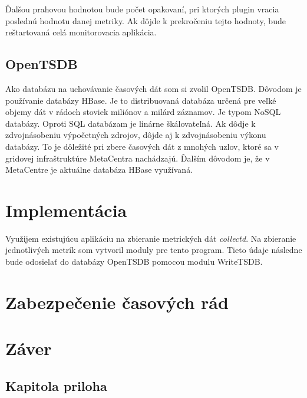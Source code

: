\documentclass[11pt,final,oneside]{fithesis}
\begin{document}
Ďalšou prahovou hodnotou bude počet opakovaní, pri ktorých plugin vracia poslednú hodnotu danej metriky. Ak dôjde k prekročeniu tejto hodnoty, bude reštartovaná celá monitorovacia aplikácia.

\section{OpenTSDB}
Ako databázu na uchovávanie časových dát som si zvolil OpenTSDB. Dôvodom je používanie databázy HBase. Je to distribuovaná databáza určená pre veľké objemy dát v rádoch stoviek miliónov a milárd záznamov. 
Je typom NoSQL databázy. Oproti SQL databázam je linárne škálovateľná. Ak dôdje k zdvojnásobeniu výpočetných zdrojov, dôjde aj k zdvojnásobeniu výkonu databázy. To je dôležité pri zbere časových dát z mnohých uzlov,
ktoré sa v gridovej infraštruktúre MetaCentra nachádzajú. Ďalším dôvodom je, že v MetaCentre je aktuálne databáza HBase využívaná.


\chapter{Implementácia}
Využijem existujúcu aplikáciu na zbieranie metrických dát \emph{collectd}. Na zbieranie jednotlivých metrík som vytvoril moduly pre tento program. Tieto údaje následne bude odosielať do databázy OpenTSDB
pomocou modulu WriteTSDB.

\chapter{Zabezpečenie časových rád}

\chapter{Záver}


\nocite{*}


\begin{appendix}
\chapter{Kapitola priloha}
\end{appendix}
\end{document}
